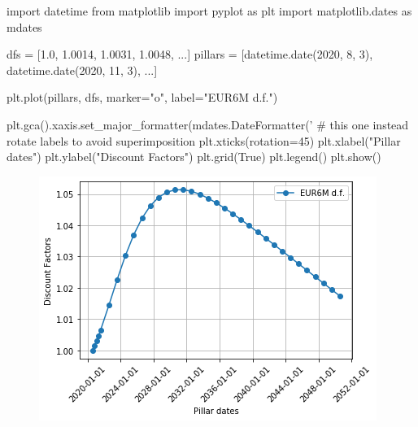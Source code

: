 \cprotEnv\begin{solution}
\begin{ipython}
import datetime
from matplotlib import pyplot as plt
import matplotlib.dates as mdates

dfs = [1.0, 1.0014, 1.0031, 1.0048, ...]
pillars = [datetime.date(2020, 8, 3), datetime.date(2020, 11, 3), ...]

plt.plot(pillars, dfs, marker="o", label="EUR6M d.f.")

plt.gca().xaxis.set_major_formatter(mdates.DateFormatter('%
# this one instead rotate labels to avoid superimposition
plt.xticks(rotation=45)
plt.xlabel("Pillar dates")
plt.ylabel("Discount Factors")
plt.grid(True)
plt.legend()
plt.show()
\end{ipython}

\begin{figure}[htb]
\begin{center}
  \includegraphics[width=0.7\linewidth]{figures/ex5.5.png}
\end{center}
\end{figure}
\end{solution}



